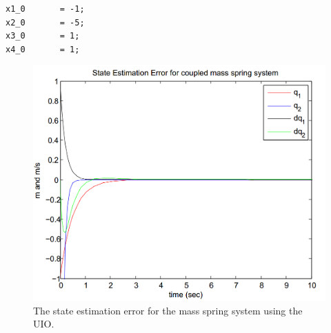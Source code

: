 \documentclass{amsart}
\theoremstyle{definition}
\theoremstyle{remark}
\numberwithin{equation}{section}
\begin{document}
\begin{verbatim}
x1_0       = -1;
x2_0       = -5;
x3_0       = 1;
x4_0       = 1;
\end{verbatim}

\begin{figure}[H]
    \centering
    \includegraphics[scale=.5]{massSpringEstErr.png}
    \caption{The state estimation error for the mass spring system using the UIO.}
    \label{fig:UIOerr}
\end{figure}
\end{document}
